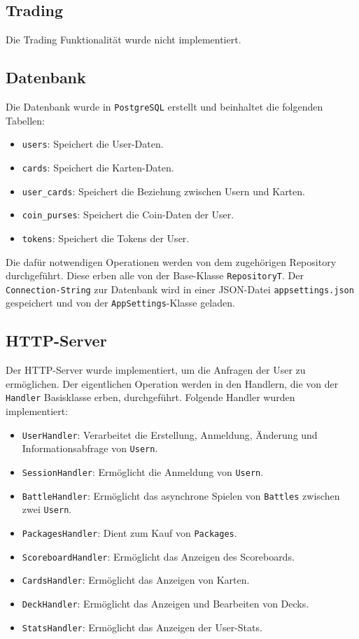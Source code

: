 \documentclass[a4paper, 12pt]{article}
\begin{document}
\subsection{Trading}
Die Trading Funktionalität wurde nicht implementiert.

\subsection{Datenbank}
Die Datenbank wurde in \texttt{PostgreSQL} erstellt und beinhaltet die folgenden Tabellen:
\begin{itemize}
    \item \texttt{users}: Speichert die User-Daten.
    \item \texttt{cards}: Speichert die Karten-Daten.
    \item \texttt{user\_cards}: Speichert die Beziehung zwischen Usern und Karten.
    \item \texttt{coin\_purses}: Speichert die Coin-Daten der User.
    \item \texttt{tokens}: Speichert die Tokens der User.
\end{itemize}
Die dafür notwendigen Operationen werden von dem zugehörigen Repository durchgeführt. Diese erben alle von der Base-Klasse \texttt{RepositoryT}.
Der \texttt{Connection-String} zur Datenbank wird in einer JSON-Datei \texttt{appsettings.json} gespeichert und von der \texttt{AppSettings}-Klasse geladen.

\subsection{HTTP-Server}
Der HTTP-Server wurde implementiert, um die Anfragen der User zu ermöglichen. Der eigentlichen Operation werden in den Handlern, die von der \texttt{Handler} Basisklasse erben, durchgeführt. Folgende Handler wurden implementiert:
\begin{itemize}
    \item \texttt{UserHandler}: Verarbeitet die Erstellung, Anmeldung, Änderung und Informationsabfrage von \texttt{Usern}.
    \item \texttt{SessionHandler}: Ermöglicht die Anmeldung von \texttt{Usern}.
    \item \texttt{BattleHandler}: Ermöglicht das asynchrone Spielen von \texttt{Battles} zwischen zwei \texttt{Usern}.
    \item \texttt{PackagesHandler}: Dient zum Kauf von \texttt{Packages}.
    \item \texttt{ScoreboardHandler}: Ermöglicht das Anzeigen des Scoreboards.
    \item \texttt{CardsHandler}: Ermöglicht das Anzeigen von Karten.
    \item \texttt{DeckHandler}: Ermöglicht das Anzeigen und Bearbeiten von Decks.
    \item \texttt{StatsHandler}: Ermöglicht das Anzeigen der User-Stats.
\end{itemize}
\end{document}
